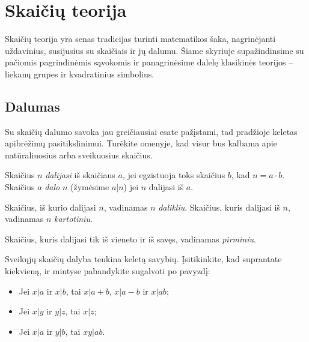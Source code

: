 
\chapter{Skaičių teorija}
\thispagestyle{empty}

Skaičių teorija yra senas tradicijas turinti matematikos šaka, nagrinėjanti
uždavinius, susijusius su skaičiais ir jų dalumu. Šiame skyriuje
supažindinsime su pačiomis pagrindinėmis sąvokomis ir panagrinėsime dalelę
klasikinės teorijos -- liekanų grupes ir kvadratinius simbolius.

\section{Dalumas}

Su skaičių dalumo savoka jau greičiausiai esate pažįstami, tad pradžioje
keletas apibrėžimų pasitikslinimui. Turėkite omenyje, kad visur bus kalbama
apie natūraliuosius arba sveikuosius skaičius.

\begin{api} 
  Skaičius $n$ \emph{dalijasi} iš skaičiaus $a$, jei egzistuoja toks
  skaičius $b$, kad $n=a\cdot b$. Skaičius $a$ \emph{dalo} $n$ (žymėsime $a|n$)
  jei $n$ dalijasi iš $a$.  
\end{api}

\begin{api}
  Skaičius, iš kurio dalijasi $n$, vadinamas $n$ \emph{dalikliu}.
  Skaičius, kuris dalijasi iš $n$, vadinamas $n$ \emph{kartotiniu}.  
\end{api}

\begin{api} 
  Skaičius, kuris dalijasi tik iš vieneto ir iš savęs, vadinamas
  \emph{pirminiu}. 
\end{api}

Sveikųjų skaičių dalyba tenkina keletą savybių. Įsitikinkite, kad
suprantate kiekvieną, ir mintyse pabandykite sugalvoti po pavyzdį:

\begin{itemize} 
  \item Jei $x|a$ ir $x|b$, tai $x|a+b$, $x|a-b$ ir $x|ab$;
  \item Jei $x|y$ ir $y|z$, tai $x|z$; 
  \item Jei $x|a$ ir $y|b$, tai $xy|ab$.  
\end{itemize}

